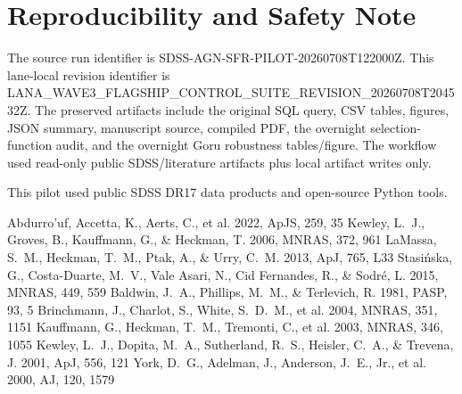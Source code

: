 \documentclass[twocolumn]{aastex631}
\begin{document}
\section*{Reproducibility and Safety Note}
The source run identifier is SDSS-AGN-SFR-PILOT-20260708T122000Z.  This lane-local revision identifier is LANA\_WAVE3\_FLAGSHIP\_CONTROL\_SUITE\_REVISION\_20260708T204532Z.  The preserved artifacts include the original SQL query, CSV tables, figures, JSON summary, manuscript source, compiled PDF, the overnight selection-function audit, and the overnight Goru robustness tables/figure.  The workflow used read-only public SDSS/literature artifacts plus local artifact writes only.

\acknowledgments
This pilot used public SDSS DR17 data products and open-source Python tools.

\begin{thebibliography}{}

 Abdurro'uf, Accetta, K., Aerts, C., et al. 2022, ApJS, 259, 35
 Kewley, L.~J., Groves, B., Kauffmann, G., \& Heckman, T. 2006, MNRAS, 372, 961
 LaMassa, S.~M., Heckman, T.~M., Ptak, A., \& Urry, C.~M. 2013, ApJ, 765, L33
 Stasi\'nska, G., Costa-Duarte, M.~V., Vale Asari, N., Cid Fernandes, R., \& Sodr\'e, L. 2015, MNRAS, 449, 559
 Baldwin, J.~A., Phillips, M.~M., \& Terlevich, R. 1981, PASP, 93, 5
 Brinchmann, J., Charlot, S., White, S.~D.~M., et al. 2004, MNRAS, 351, 1151
 Kauffmann, G., Heckman, T.~M., Tremonti, C., et al. 2003, MNRAS, 346, 1055
 Kewley, L.~J., Dopita, M.~A., Sutherland, R.~S., Heisler, C.~A., \& Trevena, J. 2001, ApJ, 556, 121
 York, D.~G., Adelman, J., Anderson, J.~E., Jr., et al. 2000, AJ, 120, 1579
\end{thebibliography}
\end{document}
